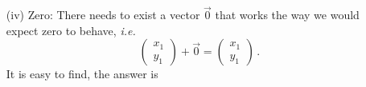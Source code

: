 {\begin{enumerate}
\begin{gather*}
\left(\begin{pmatrix}x_1\\x_2\end{pmatrix}+
\begin{pmatrix}y_1\\y_2\end{pmatrix}\right)+
\begin{pmatrix}z_1\\z_2\end{pmatrix}
=
\begin{pmatrix}x_1+y_1\\x_2+y_2\end{pmatrix}+
\begin{pmatrix}z_1\\z_2\end{pmatrix}
=
\begin{pmatrix}(x_1+y_1)+z_1\\(x_2+y_2)+z_2\end{pmatrix}
\\
=
\begin{pmatrix}x_1+(y_1+z_1)\\x_2+(y_2+z_2)\end{pmatrix}
=
\begin{pmatrix}x_1\\ y_1\end{pmatrix}+
\begin{pmatrix}y_1+z_1\\y_2+z_2\end{pmatrix}=
\begin{pmatrix}x_1\\x_2\end{pmatrix}+
\left(\begin{pmatrix}y_1\\y_2\end{pmatrix}+
\begin{pmatrix}z_1\\z_2\end{pmatrix}\right)\, .\end{gather*}
\item[(iv)] Zero: There needs to exist a vector $\vec 0$ that works the way we would 
expect zero to behave, {\itshape i.e.}
\[
\begin{pmatrix}x_1\\y_1\end{pmatrix}+\vec 0=\begin{pmatrix}x_1\\y_1\end{pmatrix}\, .
\]
It is easy to find, the answer is

\end{enumerate}}
